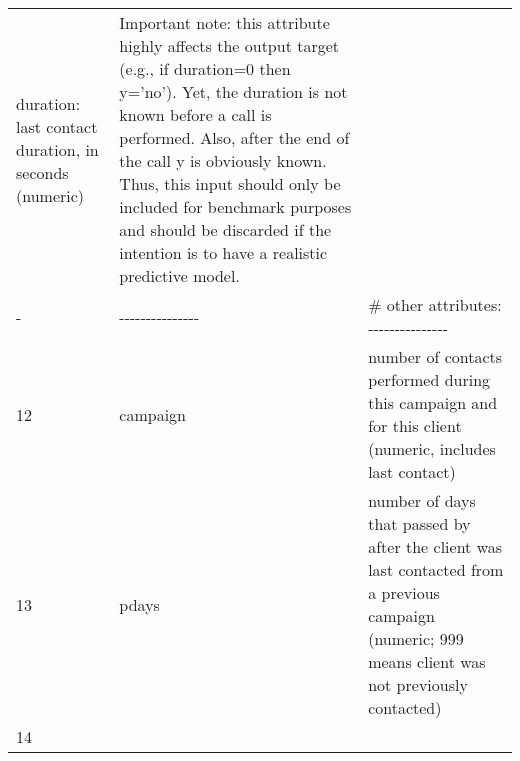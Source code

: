 \documentclass[11pt]{article}
\begin{document}
\begin{longtable}[]{@{}lll@{}}
\begin{minipage}[t]{0.12\columnwidth}
duration: last contact duration, in seconds (numeric)\strut
\end{minipage} & \begin{minipage}[t]{0.78\columnwidth}\raggedright\strut
Important note: this attribute highly affects the output target (e.g.,
if duration=0 then y='no'). Yet, the duration is not known before a call
is performed. Also, after the end of the call y is obviously known.
Thus, this input should only be included for benchmark purposes and
should be discarded if the intention is to have a realistic predictive
model.\strut
\end{minipage}\tabularnewline
\begin{minipage}[t]{0.01\columnwidth}\raggedright\strut
-\strut
\end{minipage} & \begin{minipage}[t]{0.12\columnwidth}\raggedright\strut
-\/-\/-\/-\/-\/-\/-\/-\/-\/-\/-\/-\/-\/-\/-\strut
\end{minipage} & \begin{minipage}[t]{0.78\columnwidth}\raggedright\strut
\# other attributes: -\/-\/-\/-\/-\/-\/-\/-\/-\/-\/-\/-\/-\/-\/-\strut
\end{minipage}\tabularnewline
\begin{minipage}[t]{0.01\columnwidth}\raggedright\strut
12\strut
\end{minipage} & \begin{minipage}[t]{0.12\columnwidth}\raggedright\strut
campaign\strut
\end{minipage} & \begin{minipage}[t]{0.78\columnwidth}\raggedright\strut
number of contacts performed during this campaign and for this client
(numeric, includes last contact)\strut
\end{minipage}\tabularnewline
\begin{minipage}[t]{0.01\columnwidth}\raggedright\strut
13\strut
\end{minipage} & \begin{minipage}[t]{0.12\columnwidth}\raggedright\strut
pdays\strut
\end{minipage} & \begin{minipage}[t]{0.78\columnwidth}\raggedright\strut
number of days that passed by after the client was last contacted from a
previous campaign (numeric; 999 means client was not previously
contacted)\strut
\end{minipage}\tabularnewline
\begin{minipage}[t]{0.01\columnwidth}\raggedright\strut
14\strut

\end{minipage}
\end{longtable}
\end{document}
